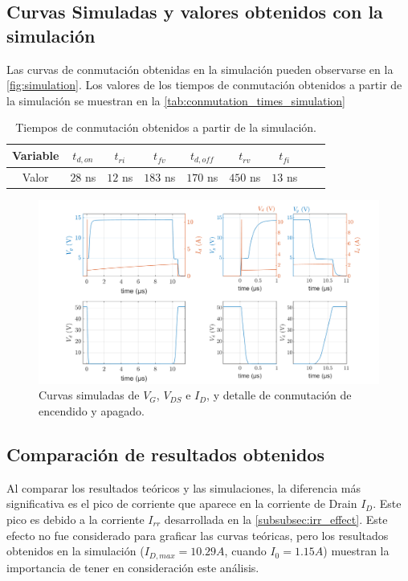 \documentclass[e4_tp1_main.tex]{subfiles}
\begin{document}
\subsection{Curvas Simuladas y valores obtenidos con la simulación}
Las curvas de conmutación obtenidas en la simulación pueden observarse en la \autoref{fig:simulation}. Los valores de los tiempos de conmutación obtenidos a partir de la simulación se muestran en la \autoref{tab:conmutation_times_simulation}
\begin{table}[H]
\centering
\begin{tabular}{|c|c|c|c|c|c|c|c|c|}
\hline
Variable & $t_{d,on}$ & $t_{ri}$ & $t_{fv}$ & $t_{d,off}$ & $t_{rv}$ & $t_{fi}$  \\
\hline
Valor & $28$ ns & $12$ ns & $183$ ns & $170$ ns & $450$ ns & $13$ ns\\
\hline
\end{tabular}	
\caption{Tiempos de conmutación obtenidos a partir de la simulación.}
\label{tab:conmutation_times_simulation}
\end{table}

\begin{figure}[h]
  \centering
  \includegraphics[width=0.7\linewidth]{images/ej1/curvas_simuladas.png}
  \caption{Curvas simuladas de $V_G$, $V_{DS}$ e $I_D$, y detalle de conmutación de encendido y apagado.}
  \label{fig:simulation}
\end{figure}

\subsection{Comparación de resultados obtenidos}
Al comparar los resultados teóricos y las simulaciones, la diferencia más significativa es el pico de corriente que aparece en la corriente de Drain $I_D$. Este pico es debido a la corriente $I_{rr}$ desarrollada en la \autoref{subsubsec:irr_effect}. Este efecto no fue considerado para graficar las curvas teóricas, pero los resultados obtenidos en la simulación ($I_{D,max}=10.29A$, cuando $I_0 = 1.15A$) muestran la importancia de tener en consideración este análisis.
\end{document}
